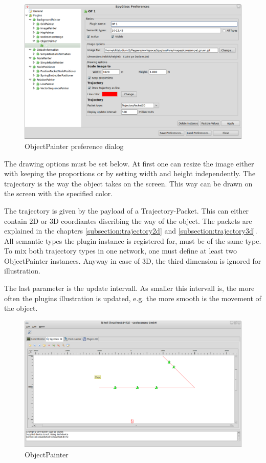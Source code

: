 \begin{figure}[htb]
  \begin{center}
    \includegraphics[width=13.2cm]{./pics/objectpainter_prefpage}
    \caption{ObjectPainter preference dialog}
    \label{pic:op_preferences}
  \end{center}
\end{figure}

The drawing options must be set below. At first one can resize the image either with keeping the proportions or by
setting width and height independently. The trajectory is the way the object takes on the screen. This way
can be drawn on the screen with the specified color.

The trajectory is given by the payload of a Trajectory-Packet. This can either contain 2D or 3D coordiantes discribing
the way of the object. The packets are explained in the chapters \ref{subsection:trajectory2d} and
\ref{subsection:trajectory3d}. All semantic types the plugin instance is registered for, must be of the same type.
To mix both trajectory types in one network, one must define at least two ObjectPainter instances. Anyway in case of
3D, the third dimension is ignored for illustration.

The last parameter is the update intervall. As smaller this intervall is, the more
often the plugins illustration is updated, e.g. the more smooth is the movement of the object.

\begin{figure}[htb]
  \begin{center}
    \includegraphics[width=13.2cm]{./pics/objectpainter}
    \caption{ObjectPainter}
    \label{pic:op}
  \end{center}
\end{figure}


